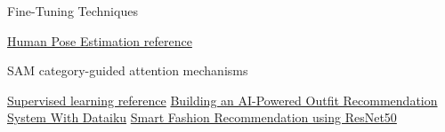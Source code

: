 Fine-Tuning Techniques

\href{https://viso.ai/deep-learning/pose-estimation-ultimate-overview/}{Human Pose Estimation reference}

SAM
category-guided attention mechanisms


\href{https://encord.com/blog/mastering-supervised-learning-a-comprehensive-guide/}{Supervised learning reference}
\href{https://blog.dataiku.com/outfit-recommendation-system}{Building an AI-Powered Outfit Recommendation System With Dataiku}
\href{https://nisargdoshi.medium.com/smart-fashion-recommendation-using-resnet50-b21d47cc91b1}{Smart Fashion Recommendation using ResNet50}